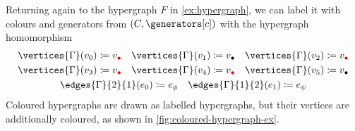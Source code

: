 \begin{example}\label{ex:coloured-hypergraph}
    Returning again to the hypergraph \(F\) in \cref{ex:hypergraph}, we can
    label it with colours and generators from \((C,\generators[c])\) with
    the hypergraph homomorphism
    \begin{gather*}
        \vertices{\Gamma}(v_0) \coloneqq v_{\redbullet}
        \quad
        \vertices{\Gamma}(v_1) \coloneqq v_{\bullet}
        \quad
        \vertices{\Gamma}(v_2) \coloneqq v_{\redbullet}
        \\
        \vertices{\Gamma}(v_3) \coloneqq v_{\redbullet}
        \quad
        \vertices{\Gamma}(v_4) \coloneqq v_{\redbullet}
        \quad
        \vertices{\Gamma}(v_5) \coloneqq v_{\bullet}
        \\
        \edges{\Gamma}{2}{1}(e_0) \coloneqq e_{\phi}
        \quad
        \edges{\Gamma}{1}{2}(e_1) \coloneqq e_{\psi}
    \end{gather*}
    Coloured hypergraphs are drawn as labelled hypergraphs, but their vertices
    are additionally coloured, as shown in \cref{fig:coloured-hypergraph-ex}.
\end{example}